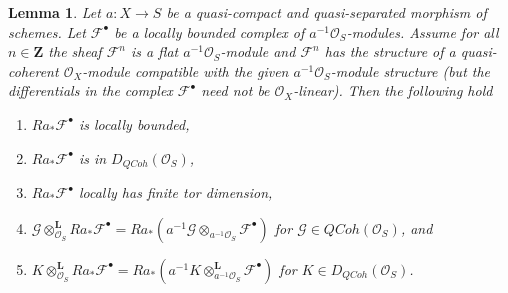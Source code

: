 \documentclass{stacks-project}
\theoremstyle{plain}
\newtheorem{lemma}[subsection]{Lemma}
\theoremstyle{definition}
\theoremstyle{remark}
\numberwithin{equation}{subsection}
\def\QCoh{\mathit{QCoh}}
\begin{document}
\begin{lemma}
\label{lemma-cohomology-de-rham-base-change}
Let $a : X \to S$ be a quasi-compact and quasi-separated morphism
of schemes. Let $\mathcal{F}^\bullet$ be a locally bounded
complex of $a^{-1}\mathcal{O}_S$-modules. Assume for all $n \in \mathbf{Z}$
the sheaf $\mathcal{F}^n$ is a flat $a^{-1}\mathcal{O}_S$-module and
$\mathcal{F}^n$ has the structure of a quasi-coherent $\mathcal{O}_X$-module
compatible with the given $a^{-1}\mathcal{O}_S$-module structure (but the
differentials in the complex $\mathcal{F}^\bullet$ need not
be $\mathcal{O}_X$-linear). Then the following hold
\begin{enumerate}
\item $Ra_*\mathcal{F}^\bullet$ is locally bounded,
\item $Ra_*\mathcal{F}^\bullet$ is in $D_\QCoh(\mathcal{O}_S)$,
\item $Ra_*\mathcal{F}^\bullet$ locally has finite tor dimension,
\item $\mathcal{G} \otimes_{\mathcal{O}_S}^\mathbf{L} Ra_*\mathcal{F}^\bullet =
Ra_*(a^{-1}\mathcal{G} \otimes_{a^{-1}\mathcal{O}_S} \mathcal{F}^\bullet)$
for $\mathcal{G} \in \QCoh(\mathcal{O}_S)$, and
\item $K \otimes_{\mathcal{O}_S}^\mathbf{L} Ra_*\mathcal{F}^\bullet =
Ra_*(a^{-1}K \otimes_{a^{-1}\mathcal{O}_S}^\mathbf{L} \mathcal{F}^\bullet)$
for $K \in D_\QCoh(\mathcal{O}_S)$.
\end{enumerate}
\end{lemma}
\end{document}
